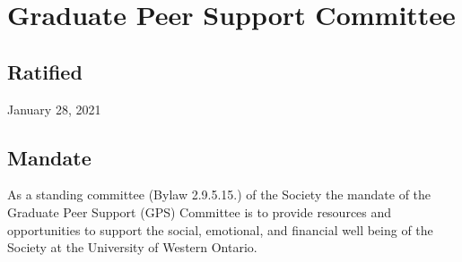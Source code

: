 \section{Graduate Peer Support Committee}

\subsection{Ratified}
January 28, 2021

\subsection{Mandate}
As a standing committee (Bylaw 2.9.5.15.) of the Society the mandate of the Graduate Peer Support (GPS) Committee is to provide resources and opportunities to support the social, emotional, and financial well being of the Society at the University of Western Ontario.

